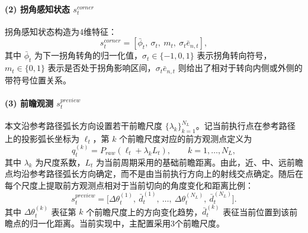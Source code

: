 \documentclass[preprint,12pt]{elsarticle}
\begin{document}
\paragraph{(2) 拐角感知状态 $s_t^{corner}$} 拐角感知状态构造为4维特征：
\begin{equation}
s_t^{corner}=[\bar\phi_t,\ \sigma_t,\ m_t,\ \sigma_t\bar e_{n,t}],
\end{equation}
其中 $\bar\phi_t$ 为下一拐角转角的归一化值，$\sigma_t\in\{-1,0,1\}$ 表示拐角转向符号，$m_t\in\{0,1\}$ 表示是否处于拐角影响区间，$\sigma_t\bar e_{n,t}$ 则给出了相对于转向内侧或外侧的带符号位置关系。

\paragraph{(3) 前瞻观测 $s_t^{preview}$} 本文沿参考路径弧长方向设置若干前瞻尺度 $\{\lambda_k\}_{k=1}^{N_L}$。记当前执行点在参考路径上的投影弧长坐标为 $\ell_t$，第 $k$ 个前瞻尺度对应的前方观测点定义为
\begin{equation}
q_t^{(k)}=P_{raw}(\ell_t+\lambda_k L_t),\qquad k=1,\dots,N_L,
\end{equation}
其中 $\lambda_k$ 为尺度系数，$L_t$ 为当前周期采用的基础前瞻距离。由此，近、中、远前瞻点均沿参考路径弧长方向确定，而不是由当前执行方向上的射线交点确定。随后在每个尺度上提取前方观测点相对于当前切向的角度变化和距离比例：
\begin{equation}
s_t^{preview}=\big[\Delta \theta_t^{(1)},\ \bar d_t^{(1)},\ \dots,\ \Delta \theta_t^{(N_L)},\ \bar d_t^{(N_L)}\big].
\end{equation}
其中 $\Delta \theta_t^{(k)}$ 表征第 $k$ 个前瞻尺度上的方向变化趋势，$\bar d_t^{(k)}$ 表征当前位置到该前瞻点的归一化距离。当前实现中，主配置采用3个前瞻尺度。
\end{document}
